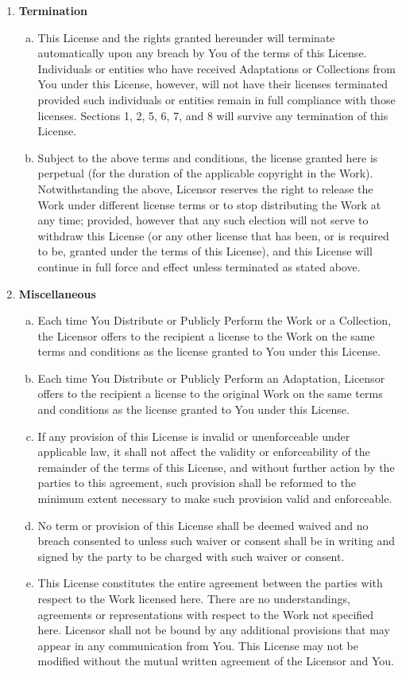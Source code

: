 \documentclass[12pt,letterpaper,oneside,final]{memoir}
\begin{document}
\begin{appendices}
\begin{enumerate}[1.]
\item \textbf{Termination}
   \begin{enumerate}[a.]
   \item This License and the rights granted hereunder will terminate automatically upon any breach by You of the terms of this License. Individuals or entities who have received Adaptations or Collections from You under this License, however, will not have their licenses terminated provided such individuals or entities remain in full compliance with those licenses. Sections 1, 2, 5, 6, 7, and 8 will survive any termination of this License.
   \item Subject to the above terms and conditions, the license granted here is perpetual (for the duration of the applicable copyright in the Work). Notwithstanding the above, Licensor reserves the right to release the Work under different license terms or to stop distributing the Work at any time; provided, however that any such election will not serve to withdraw this License (or any other license that has been, or is required to be, granted under the terms of this License), and this License will continue in full force and effect unless terminated as stated above.
   \end{enumerate}
\item \textbf{Miscellaneous}
   \begin{enumerate}[a.]
   \item Each time You Distribute or Publicly Perform the Work or a Collection, the Licensor offers to the recipient a license to the Work on the same terms and conditions as the license granted to You under this License.
   \item Each time You Distribute or Publicly Perform an Adaptation, Licensor offers to the recipient a license to the original Work on the same terms and conditions as the license granted to You under this License.
   \item If any provision of this License is invalid or unenforceable under applicable law, it shall not affect the validity or enforceability of the remainder of the terms of this License, and without further action by the parties to this agreement, such provision shall be reformed to the minimum extent necessary to make such provision valid and enforceable.
   \item No term or provision of this License shall be deemed waived and no breach consented to unless such waiver or consent shall be in writing and signed by the party to be charged with such waiver or consent.
   \item This License constitutes the entire agreement between the parties with respect to the Work licensed here. There are no understandings, agreements or representations with respect to the Work not specified here. Licensor shall not be bound by any additional provisions that may appear in any communication from You. This License may not be modified without the mutual written agreement of the Licensor and You.

\end{enumerate}
\end{enumerate}
\end{appendices}
\end{document}
